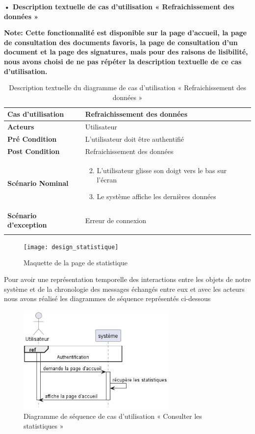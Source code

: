 \textbf{•	Description textuelle de cas d'utilisation « Refraichissement
des données »}

\textbf{Note: Cette fonctionnalité est disponible sur la page d'accueil, la page de consultation des documents favoris, la page de consultation d'un document et la page des signatures, mais pour des raisons de lisibilité, nous avons choisi de ne pas répéter la description textuelle de ce cas d'utilisation.}

\begin{longtable}{|p{5cm}|p{10cm}|}
\hline
\textbf{Cas d'utilisation}&Refraichissement des données\\
\hline
\textbf{Acteurs}&Utilisateur \\
\hline
\textbf{Pré Condition}&L'utilisateur doit être authentifié\\
\hline
\textbf{Post Condition}&Refraichissement des données\\
\hline
\textbf{Scénario Nominal}&
\vspace{-\baselineskip}
\begin{enumerate}
    \setcounter{enumi}{1}
      \item L'utilisateur glisse son doigt vers le bas sur l'écran
      \item Le système affiche les dernières données
\end{enumerate}\\
\hline
\textbf{Scénario d'exception}&Erreur de connexion\\
\hline
\caption{Description textuelle du diagramme de cas d'utilisation « Refraichissement des données »}
\label{tab:use_case_refraichissement_donnees}
\end{longtable}

\begin{figure}[H]
  \centering
  \texttt{[image: design\_statistique]}
  \caption{Maquette de la page de statistique}
  \label{fig:design_statistique}
\end{figure}


Pour avoir une représentation temporelle des interactions entre les objets de notre système et de la chronologie des messages échangés entre eux et avec les acteurs nous avons réalisé les diagrammes de séquence représentés ci-dessous

\begin{figure}[H]
  \centering
  \includegraphics[width=0.7\textwidth]{out/diagrams/sprint7/view_stats/view_stats}
  \caption{Diagramme de séquence de cas d'utilisation « Consulter les statistiques »}
  \label{fig:sequence_view_stats}
\end{figure}

